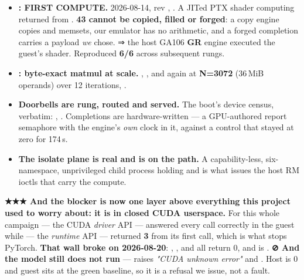 \documentclass[10.5pt]{article}
\begin{document}
\begin{claimbox}
\begin{itemize}\small
\item \textbf{: FIRST COMPUTE.} \measured{} 2026-08-14, rev ,
  . A JITed PTX shader computing  returned
   from . \textbf{43 cannot be copied, filled or forged}: a copy
  engine copies and memsets, our emulator has no arithmetic, and a forged completion carries a
  payload \emph{we} chose. ⇒ the host GA106 \textbf{GR} engine executed the guest's shader.
  Reproduced \textbf{6/6} across subsequent rungs.
\item \textbf{: byte-exact matmul at scale.} , , and again at \textbf{N=3072} (36\,MiB operands)
  over 12 iterations, .
\item \textbf{Doorbells are rung, routed and served.} The  boot's device census,
  verbatim: , . Completions are hardware-written — a GPU-authored report semaphore with the
  engine's \emph{own} clock in it, against a control that stayed at zero for 174\,s.
\item \textbf{The isolate plane is real and is on the path.} A capability-less, six-namespace,
  unprivileged child process holding  and  is what issues
  the host RM ioctls that carry the compute.
\end{itemize}

\smallskip
\textbf{★★★ And the blocker is now one layer above everything this project used to worry about:
it is in closed CUDA userspace.} For this whole campaign  — the CUDA \emph{driver}
API — answered every call correctly in the guest while  — the \emph{runtime} API —
returned \textbf{3} from its first call, which is what stops PyTorch. \textbf{That wall broke on
2026-08-20}: , ,  and
 all return 0, and  is .
\textbf{⊘ And the model still does not run} —  raises
\emph{"CUDA unknown error"} and . Host  is 0 and guest
 sits at the green baseline, so it is a refusal we issue, not a fault.


\end{claimbox}
\end{document}
